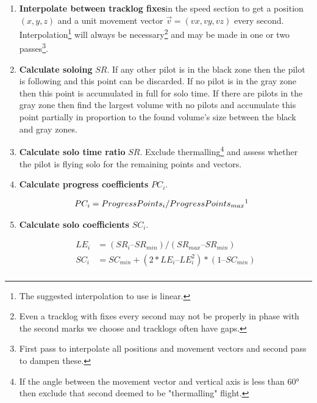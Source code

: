 \documentclass[gap.tex]{subfiles}
\begin{document}
\begin{enumerate}
    \item \textbf{Interpolate between tracklog fixes}\footnotemark in the speed
        section to get a position \((x, y, z)\) and a unit movement vector
        \(\vec{v} = (vx, vy, vz)\) every second. Interpolation\footnote{The
        suggested interpolation to use is linear.} will always be
        necessary\footnote{Even a tracklog with fixes every second may not be
        properly in phase with the second marks we choose and tracklogs often
        have gaps.} and may be made in one or two passes\footnote{First pass to
        interpolate all positions and movement vectors and second pass to
        dampen these.}.

    \item \textbf{Calculate soloing} \(SR\). If any other pilot is in the black
        zone then the pilot is following and this point can be discarded. If no
        pilot is in the gray zone then this point is accumulated in full for
        solo time. If there are pilots in the gray zone then find the largest
        volume with no pilots and accumulate this point partially in proportion
        to the found volume's size between the black and gray zones.
    
    \item \textbf{Calculate solo time ratio} \(SR\). Exclude
        thermalling\footnote{If the angle between the movement vector and
        vertical axis is less than 60° then exclude that second deemed to be
        "thermalling" flight.} and assess whether the pilot is flying solo for
        the remaining points and vectors.
    
    \item \textbf{Calculate progress coefficients} \(PC_i\).
        
        \begin{align*}
            PC_i &= ProgressPoints_i / ProgressPoints_{max}\footnotemark
        \end{align*}

    \item \textbf{Calculate solo coefficients} \(SC_i\).
        
        \begin{align*}
            LE_i &= (SR_i – SR_{min}) / (SR_{max} – SR_{min}) \\
            SC_i &= SC_{min} + (2*LE_i – LE_i^2) * (1 – SC_{min}) \\
        \end{align*}
            

\end{enumerate}
\end{document}
